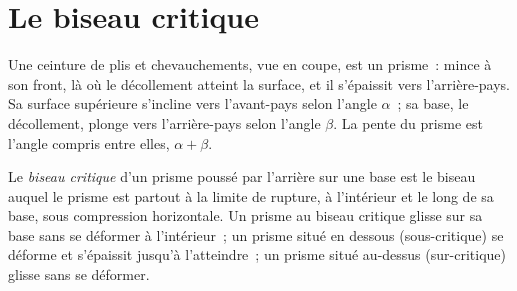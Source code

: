 \begin{omfigure}
\par{}\label{fig:b3:orogenic-wedges:duplex}
\end{omfigure}


\section{Le biseau critique}\label{sec:b3:orogenic-wedges:taper}

Une ceinture de plis et chevauchements, vue en coupe, est un prisme~: mince à son front, là où
le décollement atteint la surface, et il s'épaissit vers l'arrière-pays.
Sa surface supérieure s'incline vers l'avant-pays selon l'angle $\alpha$~; sa
base, le décollement, plonge vers l'arrière-pays selon l'angle $\beta$. La
pente du prisme est l'angle compris entre elles, $\alpha + \beta$.

\begin{definition}\label{def:b3:orogenic-wedges:critical-taper}
Le \emph{biseau critique} d'un prisme poussé par l'arrière
sur une base est le biseau auquel le prisme est partout à la limite de
rupture, à l'intérieur et le long de sa base, sous compression horizontale. Un prisme
au biseau critique glisse sur sa base sans se déformer à l'intérieur~; un
prisme situé en dessous (sous-critique) se déforme et s'épaissit jusqu'à l'atteindre~; un
prisme situé au-dessus (sur-critique) glisse sans se déformer.
\end{definition}

